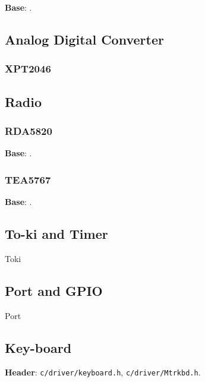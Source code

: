 \textbf{Base}: .



\subsection{Analog Digital Converter}



\subsubsection{XPT2046}



\subsection{Radio}



\subsubsection{RDA5820}

\textbf{Base}: .



\subsubsection{TEA5767}

\textbf{Base}: .



\subsection{To-ki and Timer}

{Toki}



\subsection{Port and GPIO}

{Port}



\subsection{Key-board}

\textbf{Header}: \verb|c/driver/keyboard.h|, \verb|c/driver/Mtrkbd.h|.



